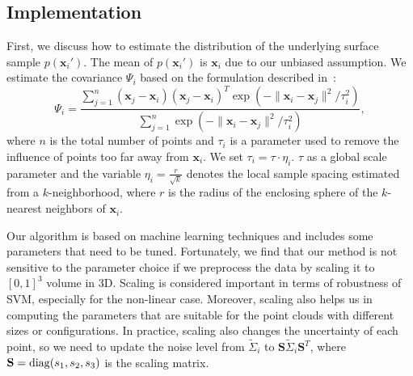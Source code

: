 \subsection{Implementation}
First, we discuss how to estimate the distribution of the underlying surface sample $p(\mathbf x_i')$. The mean of $p(\mathbf x_i')$ is $\mathbf x_i$ due to our unbiased assumption. We estimate the covariance $\Psi_i$ based on the formulation described in~\cite{Pauly:2004}:
\begin{equation}
\Psi_i = \frac{\sum_{j=1}^n (\mathbf x_j - \mathbf x_i)(\mathbf x_j - \mathbf x_i)^T \exp(-\|\mathbf x_i - \mathbf x_j\|^2 / \tau_i^2)}{\sum_{j=1}^n  \exp(-\|\mathbf x_i - \mathbf x_j\|^2 / \tau_i^2)},
\end{equation}
where $n$ is the total number of points and $\tau_i$ is a parameter used to remove the influence of points too far away from $\mathbf x_i$. We set $\tau_i = \tau \cdot \eta_i$. $\tau$ as a global scale parameter and the variable $\eta_i = \frac{r}{\sqrt{k}}$ denotes the local sample spacing estimated from a $k$-neighborhood, where $r$ is the radius of the enclosing sphere of the $k$-nearest neighbors of $\mathbf x_i$.

Our algorithm is based on machine learning techniques and includes some parameters that need to be tuned. Fortunately, we find that our method is not sensitive to the parameter choice if we preprocess the data by scaling it to $[0,1]^3$ volume in 3D. Scaling is considered important in terms of robustness of SVM, especially for the non-linear case. Moreover, scaling also helps us in computing the parameters that are suitable for the point clouds with different sizes or configurations. In practice, scaling also changes the uncertainty of each point, so we need to update the noise level from $\widetilde{\Sigma}_i$ to $\mathbf S \widetilde{\Sigma}_i \mathbf S^T$, where $\mathbf S = \diag(s_1, s_2, s_3)$ is the scaling matrix.

